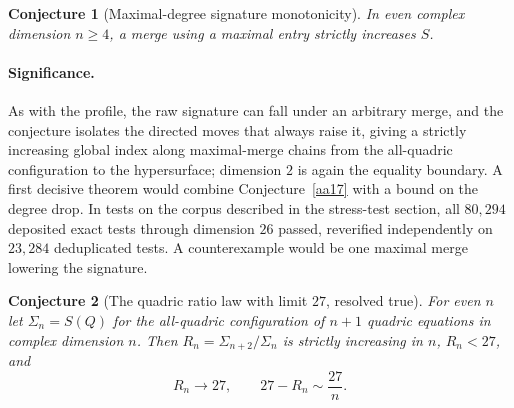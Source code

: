 \documentclass[11pt]{article}
\newtheorem{conjecture}{Conjecture}
\theoremstyle{definition}
\begin{document}
\begin{conjecture}[Maximal-degree signature monotonicity]\label{aa18}
In even complex dimension $n\ge4$, a merge using a maximal entry strictly increases $S$.
\end{conjecture}

\paragraph{Significance.}
As with the profile, the raw signature can fall under an arbitrary merge, and the conjecture isolates the directed moves that always raise it, giving a strictly increasing global index along maximal-merge chains from the all-quadric configuration to the hypersurface; dimension $2$ is again the equality boundary.  A first decisive theorem would combine Conjecture~\ref{aa17} with a bound on the degree drop.  In tests on the corpus described in the stress-test section, all $80{,}294$ deposited exact tests through dimension $26$ passed, reverified independently on $23{,}284$ deduplicated tests.  A counterexample would be one maximal merge lowering the signature.

\begin{conjecture}[The quadric ratio law with limit $27$, resolved true]\label{aa19}
For even $n$ let $\Sigma_n=S(Q)$ for the all-quadric configuration of $n+1$ quadric equations in complex dimension $n$.  Then $R_n=\Sigma_{n+2}/\Sigma_n$ is strictly increasing in $n$, $R_n<27$, and
\[
R_n\to27,\qquad 27-R_n\sim\frac{27}{n}.
\]
\end{conjecture}
\end{document}

